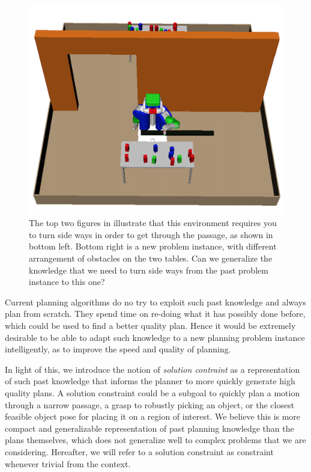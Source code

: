 \begin{figure}[htb]
\includegraphics[scale=0.2]{./figures/motivation/2.png}
\caption{ The top two figures in illustrate that this environment
requires you to turn side ways in order to get through the passage, as
shown in bottom left. Bottom right is a new problem instance, with different
arrangement of obstacles on the two tables. Can
we generalize the knowledge that we need to turn side ways from the past problem instance to this one?}
\label{fig:motiv}
\end{figure} 


Current planning algorithms do no try to 
exploit such past knowledge and always plan from scratch.
They spend time on re-doing what it has possibly done before,
which could be used to find a better quality plan. Hence it would
be extremely desirable to be able to adapt such knowledge to
a new planning problem instance intelligently,
as to improve the speed and quality of planning.

In light of this, we introduce the notion of 
\emph{solution contraint} as a representation
 of such past knowledge that informs the 
planner to more quickly generate high quality plans.
A solution constraint could be a
subgoal to quickly plan a motion through a narrow passage,
a grasp to robustly picking an object,
or the closest feasible object pose for placing 
it on a region of interest. We believe
this is more compact and generalizable
representation of past planning knowledge than the 
plans themselves, which does not generalize well
to complex problems that we are considering. Hereafter,
we will refer to a solution constraint as 
constraint whenever trivial from the context.

